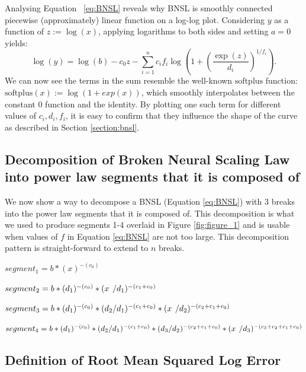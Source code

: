 \documentclass{article} %
\begin{document}
Analysing Equation ~\ref{eq:BNSL} reveals why BNSL is smoothly connected piecewise (approximately) linear function on a log-log plot. %
Considering $y$ as a function of $z:=\log(x)$, applying logarithms to both sides and setting $a=0$ yields:
\begin{equation}
\log (y) =  \log (b) - c_0 z -  \sum_{i=1}^n c_i f_i \log\left(1 + \left(\frac{\exp(z)}{d_i}\right)^{1/f_i}\right).
\end{equation}
We can now see the terms in the sum resemble the well-known $\mathrm{softplus}$ function: $\mathrm{softplus}(x) := \log(1 + exp(x))$, which smoothly interpolates between the constant 0 function and the identity.
By plotting one such term for different values of $c_i, d_i, f_i$, it is easy to confirm that they influence the shape of the curve as described in Section \ref{section:bnsl}.


\subsection{Decomposition of Broken Neural Scaling Law into power law segments that it is composed of}
\label{section:decomposition_of_BNSL}

We now show a way to decompose a BNSL (Equation \ref{eq:BNSL}) with 3 breaks into the power law segments that it is composed of. This decomposition is what we used to produce segments 1-4 overlaid in Figure \ref{fig:figure_1} and is usable when values of $f$ in Equation \ref{eq:BNSL} are not too large. This decomposition pattern is straight-forward to extend to $n$ breaks.

$segment_1 = b * (x)^{-(c_0)}$

$segment_2 = b * (d_1)^{-(c_0)} * (x\hspace{.14cm}/d_1)^{-(c_1+c_0)}$

$segment_3 = b * (d_1)^{-(c_0)} * (d_2/d_1)^{-(c_1+c_0)} * (x\hspace{.14cm}/d_2)^{-(c_2+c_1+c_0)}$

$segment_4 = b * (d_1)^{-(c_0)} * (d_2/d_1)^{-(c_1+c_0)} * (d_3/d_2)^{-(c_2+c_1+c_0)} * (x\hspace{.14cm}/d_3)^{-(c_3+c_2+c_1+c_0)}$




\subsection{Definition of Root Mean Squared Log Error}
\label{section:definition_of_Root_Mean_Squared_Log_Error}
\end{document}
